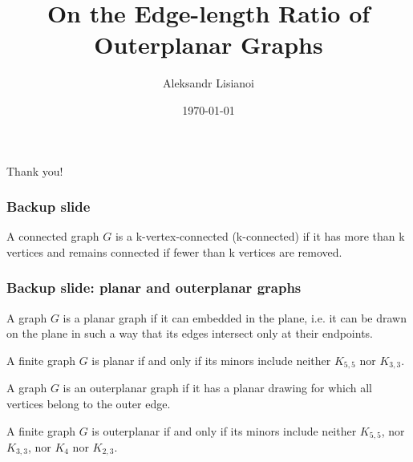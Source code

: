 \documentclass[xetex,mathserif,serif]{beamer}
\title{On the Edge-length Ratio of Outerplanar Graphs}
\author{Aleksandr Lisianoi}
\institute{Technische Universität Wien}
\date{\today}
\begin{document}
\maketitle

\begin{frame}[standout]
  Thank you!
  \end{frame}

  \begin{frame}
    \frametitle{Backup slide}

    \begin{definition}
      A connected graph \(G\) is a k-vertex-connected (k-connected) if it has more than k vertices and remains connected if fewer than k vertices are removed.
    \end{definition}
  \end{frame}

  \begin{frame}
    \frametitle{Backup slide: planar and outerplanar graphs}

    \begin{definition}
      A graph \(G\) is a planar graph if it can embedded in the plane, i.e. it can be drawn on the plane in such a way that its edges intersect only at their endpoints.
    \end{definition}

    \begin{definition}
      A finite graph \(G\) is planar if and only if its minors include neither \(K_{5,5}\) nor \(K_{3, 3}\).
    \end{definition}

    \begin{definition}
      A graph \(G\) is an outerplanar graph if it has a planar drawing for which all vertices belong to the outer edge.
    \end{definition}

    \begin{definition}
      A finite graph \(G\) is outerplanar if and only if its minors include neither \(K_{5, 5}\), nor \(K_{3, 3}\), nor \(K_4\) nor \(K_{2, 3}\).
    \end{definition}
  \end{frame}
\end{document}
